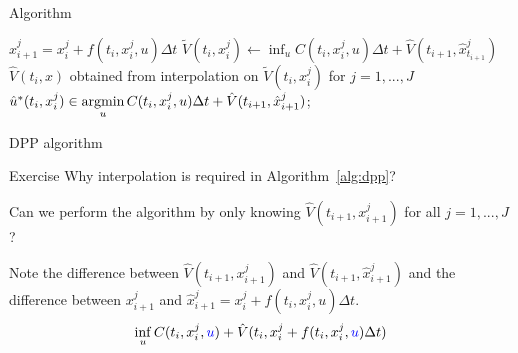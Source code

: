 \documentclass[color=usenames,dvipsnames]{beamer}
\begin{document}
\begin{frame}{Algorithm}
    ~~~~~~~~\begin{algorithm}[H]
        {$\hat{x}^j_{i+1}=x_i^j+f(t_{i},x_i^j,u)\Delta t$\;
        $\tilde{V}(t_{i},x^j_i)\leftarrow \inf_{u}C(t_{i},{x}^j_{i},u){{\Delta t}}+\hat{V}(t_{i+1},\hat{x}^j_{t_{i+1}})$\;
        $\hat{V}(t_{i},x)$ obtained from interpolation on $\tilde{V}(t_{i},x^j_i)$ for $j=1,...,J$\;
        $\hat{u}^*(t_i,x_i^j)\in\mathop{\text{\normalfont argmin}}\limits_{u}C(t_{i},{x}^j_{i},u){{\Delta t}}+\hat{V}(t_{i+1},\hat{x}^j_{i+1})$;
        }
        \caption{Numerical DPP}
         \label{alg:dpp}
\end{algorithm}
\end{frame}
\begin{frame}{DPP algorithm}
\begin{block}
    {Exercise}
    Why interpolation is required in Algorithm~\ref{alg:dpp}? 
    
    Can we perform the algorithm by only knowing  $\hat{V}(t_{i+1},{x}^j_{i+1})$ for all $j=1,...,J$? 
    
    Note the difference between $\hat{V}(t_{i+1},{x}^j_{i+1})$ and $\hat{V}(t_{i+1},\hat{x}^j_{i+1})$ and the difference between ${x}^j_{i+1}$ and $\hat{x}^j_{i+1} = {x}^j_{i} + f(t_{i},x_{i}^j,u)\Delta t$.
    \[
    \inf_u C(t_i,x_i^j,{\color{blue}u})+\hat{V}(t_i,{x}^j_{i} + f(t_{i},x_i^j,{\color{blue}u})\Delta t)
    \]
\end{block}
\end{frame}
\end{document}
